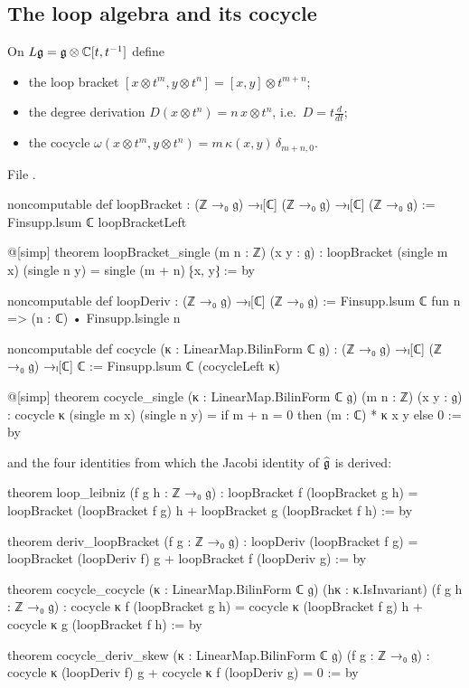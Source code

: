 \subsection{The loop algebra and its cocycle}

\begin{definition}\label{l02:def:loop}
On $L\mathfrak{g} = \mathfrak{g}\otimes{\mathbb{C}}[t,t^{-1}]$ define
\begin{itemize}
\item the loop bracket $[x\otimes t^m, y\otimes t^n] = [x,y]\otimes t^{m+n}$;
\item the degree derivation $D(x\otimes t^n) = n\,x\otimes t^n$, i.e.\ $D = t\frac{d}{dt}$;
\item the cocycle $\omega(x\otimes t^m, y\otimes t^n) = m\,\kappa(x,y)\,\delta_{m+n,0}$.
\end{itemize}
\end{definition}

File .
\begin{leancode}
noncomputable def loopBracket : (ℤ →₀ 𝔤) →ₗ[ℂ] (ℤ →₀ 𝔤) →ₗ[ℂ] (ℤ →₀ 𝔤) :=
  Finsupp.lsum ℂ loopBracketLeft

@[simp] theorem loopBracket_single (m n : ℤ) (x y : 𝔤) :
    loopBracket (single m x) (single n y) = single (m + n) ⁅x, y⁆ := by

noncomputable def loopDeriv : (ℤ →₀ 𝔤) →ₗ[ℂ] (ℤ →₀ 𝔤) :=
  Finsupp.lsum ℂ fun n => (n : ℂ) • Finsupp.lsingle n

noncomputable def cocycle (κ : LinearMap.BilinForm ℂ 𝔤) :
    (ℤ →₀ 𝔤) →ₗ[ℂ] (ℤ →₀ 𝔤) →ₗ[ℂ] ℂ :=
  Finsupp.lsum ℂ (cocycleLeft κ)

@[simp] theorem cocycle_single (κ : LinearMap.BilinForm ℂ 𝔤) (m n : ℤ) (x y : 𝔤) :
    cocycle κ (single m x) (single n y) = if m + n = 0 then (m : ℂ) * κ x y else 0 := by
\end{leancode}
and the four identities from which the Jacobi identity of $\widehat{\mathfrak{g}}$ is derived:
\begin{leancode}
theorem loop_leibniz (f g h : ℤ →₀ 𝔤) :
    loopBracket f (loopBracket g h)
      = loopBracket (loopBracket f g) h + loopBracket g (loopBracket f h) := by

theorem deriv_loopBracket (f g : ℤ →₀ 𝔤) :
    loopDeriv (loopBracket f g)
      = loopBracket (loopDeriv f) g + loopBracket f (loopDeriv g) := by

theorem cocycle_cocycle (κ : LinearMap.BilinForm ℂ 𝔤) (hκ : κ.IsInvariant) (f g h : ℤ →₀ 𝔤) :
    cocycle κ f (loopBracket g h)
      = cocycle κ (loopBracket f g) h + cocycle κ g (loopBracket f h) := by

theorem cocycle_deriv_skew (κ : LinearMap.BilinForm ℂ 𝔤) (f g : ℤ →₀ 𝔤) :
    cocycle κ (loopDeriv f) g + cocycle κ f (loopDeriv g) = 0 := by
\end{leancode}

